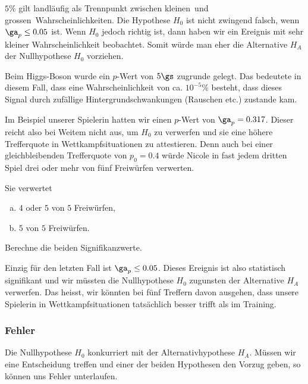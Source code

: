 \documentclass[%
11pt,%
twoside,%
titlepage,%
german,%
headsepline%
]{scrartcl}
\begin{document}
\begin{bem}
$5\%$ gilt landläufig als Trennpunkt zwischen \glqq kleinen\grqq\ und \glqq grossen\grqq\ Wahr\-schein\-lich\-kei\-ten. Die Hypothese $H_0$ ist nicht zwingend falsch, wenn $\ga_p\leq0.05$ ist. Wenn $H_0$ jedoch richtig ist, dann haben wir ein Ereignis mit sehr kleiner Wahrscheinlichkeit beobachtet. Somit würde man eher die Alternative $H_A$ der Nullhypothese $H_0$ vorziehen.
\end{bem}

\begin{bem}
Beim Higgs-Boson wurde ein $p$-Wert von $5\gs$ zugrunde gelegt. Das bedeutete in diesem Fall, dass eine Wahrscheinlichkeit von ca. $10^{-5}$\% besteht, dass dieses Signal durch zufällige Hintergrundschwankungen (Rauschen etc.) zustande kam. 
\end{bem}

Im
Beispiel unserer Spielerin hatten wir einen $p$-Wert von $\ga_p=0.317$. Dieser reicht also bei Weitem nicht aus, um $H_0$ zu verwerfen und sie eine höhere Trefferquote in Wettkampfsituationen zu attestieren. Denn auch bei einer gleichbleibenden Trefferquote von $p_0=0.4$ würde Nicole in fast jedem dritten Spiel drei oder mehr von fünf Freiwürfen verwerten.

\begin{ueb}
Sie verwertet
\begin{enumerate}[a)]
\item $4$ oder $5$ von $5$ Freiwürfen,
\item $5$ von $5$ Freiwürfen.
\end{enumerate}
Berechne die beiden Signifikanzwerte. 
\end{ueb}

Einzig für den letzten Fall ist $\ga_p\leq0.05$. Dieses Ereignis ist also statistisch signifikant und wir müssten die Nullhypothese $H_0$ zugunsten der Alternative $H_A$ verwerfen. Das heisst, wir könnten bei fünf Treffern davon ausgehen, dass unsere Spielerin in Wettkampfsituationen tatsächlich besser trifft als im Training.

\subsubsection{Fehler}

Die Nullhypothese $H_0$ konkurriert mit der Alternativhypothese $H_A$. Müssen wir eine Entscheidung treffen und einer der beiden Hypothesen den Vorzug geben, so können uns Fehler unterlaufen.
\end{document}
